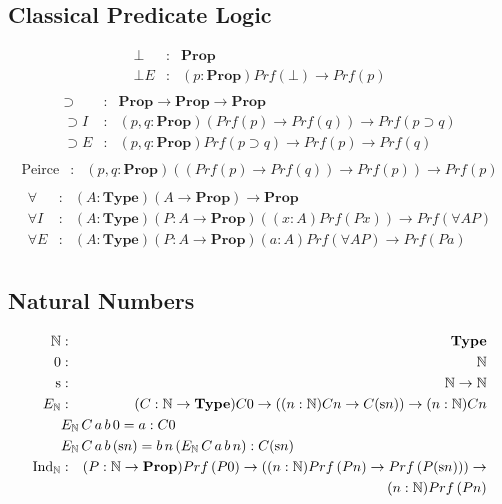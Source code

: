 \documentclass[acmtocl]{acmtrans2m}
\newcommand{\Type}{\mathbf{Type}}
\newcommand{\Prop}{\mathbf{Prop}}
\newcommand{\Prf}[1]{Prf \left( {#1} \right)}
\newcommand{\s}{\mathrm{s}}
\newcommand{\IN}{\mathrm{Ind}_\mathbb{N}}
\begin{document}
\subsection{Classical Predicate Logic}
\begin{eqnarray*}
\bot & : & \Prop \\
\bot E & : & (p : \Prop) \Prf{\bot} \rightarrow \Prf{p} \\
\end{eqnarray*}
\begin{eqnarray*}
\supset & : & \Prop \rightarrow \Prop \rightarrow \Prop \\
\supset I & : & (p,q : \Prop) (\Prf{p} \rightarrow \Prf{q}) \rightarrow \Prf{p \supset q} \\
\supset E & : & (p,q : \Prop) \Prf{p \supset q} \rightarrow \Prf{p} \rightarrow \Prf{q} \\
\end{eqnarray*}
\begin{eqnarray*}
\mathrm{Peirce} & : & (p,q : \Prop) ((\Prf{p} \rightarrow \Prf{q}) \rightarrow \Prf{p}) \rightarrow \Prf{p} \\
\end{eqnarray*}
\begin{eqnarray*}
\forall & : & (A : \Type) (A \rightarrow \Prop) \rightarrow \Prop \\
\forall I & : & (A : \Type) (P : A \rightarrow \Prop) ((x : A) \Prf{Px}) \rightarrow \Prf{\forall A P} \\
\forall E & : & (A : \Type) (P : A \rightarrow \Prop) (a : A) \Prf{\forall A P} \rightarrow \Prf{Pa} \\
\end{eqnarray*}
\subsection{Natural Numbers}
\begin{eqnarray*}
\mathbb{N} & : & \Type \\
0 & : & \mathbb{N} \\
\s & : & \mathbb{N} \rightarrow \mathbb{N} \\
E_\mathbb{N} & : & (C : \mathbb{N} \rightarrow \Type) C 0 \rightarrow ((n : \mathbb{N}) C n \rightarrow C (\s n)) \rightarrow (n : \mathbb{N}) C n \\
\lefteqn{E_\mathbb{N} \, C \, a \, b \, 0 = a : C 0} \\
\lefteqn{E_\mathbb{N} \, C \, a \, b \, (\s n)
  =  b \, n \, (E_\mathbb{N} \, C \, a \, b \, n) : C (\s n)} \\
\IN & : & (P : \mathbb{N} \rightarrow \Prop) \Prf{P 0} \rightarrow ((n : \mathbb{N}) \Prf{Pn} \rightarrow \Prf{P(\s n)}) \rightarrow \\
& & \quad (n : \mathbb{N}) \Prf{Pn} \\
\end{eqnarray*}
\end{document}
